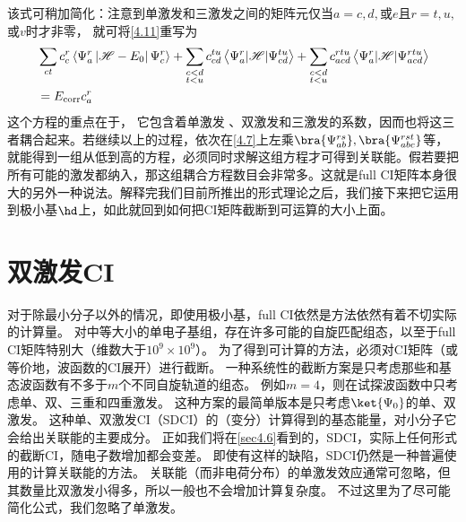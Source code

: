 该式可稍加简化：注意到单激发和三激发之间的矩阵元仅当$a=c,d,$或$e$且$r=t,u,$或$v$时才非零，
就可将\autoref{4.11}重写为
\begin{align}
&\sum_{c t} c_{c}^{r}\left\langle\Psi_{a}^{r}\left|\mathscr{H}-E_{0}\right| \Psi_{c}^{r}\right\rangle+\sum_{\substack{c<d \\ t<u}} c_{cd}^{tu}\left\langle\Psi_{a}^{r}|\mathscr{H}| \Psi_{c d}^{tu}\right\rangle+\sum_{\substack{c<d\\ t<u}} c_{acd}^{rtu}\left\langle\Psi_{a}^{r}|\mathscr{H}| \Psi_{acd}^{rtu}\right\rangle \notag \\
&=E_{\mathrm{corr}} c_{a}^{r}
\label{4.12}
\end{align}
这个方程的重点在于，
它包含着单激发
、双激发和三激发的系数，因而也将这三者耦合起来。若继续以上的过程，依次在\autoref{4.7}上左乘$\bra{\Psi_{ab}^{rs}},\bra{\Psi_{abc}^{rst}}$等，就能得到一组从低到高的方程，必须同时求解这组方程才可得到关联能。假若要把所有可能的激发都纳入，那这组耦合方程数目会非常多。这就是full CI矩阵本身很大的另外一种说法。解释完我们目前所推出的形式理论之后，我们接下来把它运用到极小基$\hd$上，如此就回到如何把CI矩阵截断到可运算的大小上面。





















\section{双激发CI}\mbox{}
\label{sec4.2}
对于除最小分子以外的情况，即使用极小基，full CI依然是方法依然有着不切实际的计算量。
对中等大小的单电子基组，存在许多可能的自旋匹配组态，以至于full CI矩阵特别大（维数大于$10^9\times 10^9$）。
为了得到可计算的方法，必须对CI矩阵（或等价地，波函数的CI展开）进行截断。
一种系统性的截断方案是只考虑那些和\hft 基态波函数有不多于$m$个不同自旋轨道的组态。
例如$m=4$，则在试探波函数中只考虑单、双、三重和四重激发。
这种方案的最简单版本是只考虑$\ket{\Psi_0}$的单、双激发。
这种单、双激发CI（SDCI）的（变分）计算得到的基态能量，对小分子它会给出关联能的主要成分。
正如我们将在\autoref{sec4.6}看到的，SDCI，实际上任何形式的截断CI，随电子数增加都会变差。
即使有这样的缺陷，SDCI仍然是一种普遍使用的计算关联能的方法。
关联能（而非电荷分布）的单激发效应通常可忽略，但其数量比双激发小得多，所以一般也不会增加计算复杂度。
不过这里为了尽可能简化公式，我们忽略了单激发。

